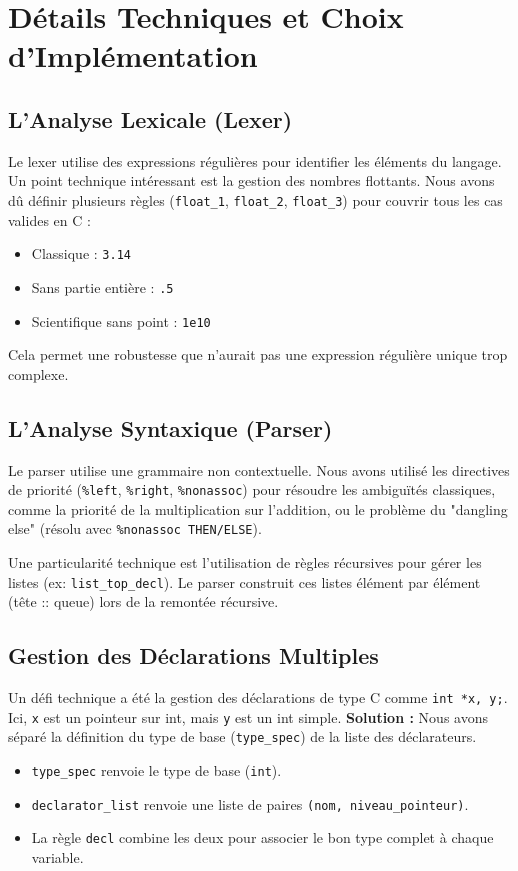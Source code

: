 \documentclass[a4paper,11pt]{article}
\begin{document}
\section{Détails Techniques et Choix d'Implémentation}

\subsection{L'Analyse Lexicale (Lexer)}
Le lexer utilise des expressions régulières pour identifier les éléments du langage.
Un point technique intéressant est la gestion des nombres flottants. Nous avons dû définir plusieurs règles (\texttt{float\_1}, \texttt{float\_2}, \texttt{float\_3}) pour couvrir tous les cas valides en C :
\begin{itemize}
    \item Classique : \texttt{3.14}
    \item Sans partie entière : \texttt{.5}
    \item Scientifique sans point : \texttt{1e10}
\end{itemize}
Cela permet une robustesse que n'aurait pas une expression régulière unique trop complexe.

\subsection{L'Analyse Syntaxique (Parser)}
Le parser utilise une grammaire non contextuelle. Nous avons utilisé les directives de priorité (\texttt{\%left}, \texttt{\%right}, \texttt{\%nonassoc}) pour résoudre les ambiguïtés classiques, comme la priorité de la multiplication sur l'addition, ou le problème du "dangling else" (résolu avec \texttt{\%nonassoc THEN/ELSE}).

Une particularité technique est l'utilisation de règles récursives pour gérer les listes (ex: \texttt{list\_top\_decl}). Le parser construit ces listes élément par élément (tête :: queue) lors de la remontée récursive.

\subsection{Gestion des Déclarations Multiples}
Un défi technique a été la gestion des déclarations de type C comme \texttt{int *x, y;}.
Ici, \texttt{x} est un pointeur sur int, mais \texttt{y} est un int simple.
\textbf{Solution :} Nous avons séparé la définition du type de base (\texttt{type\_spec}) de la liste des déclarateurs.
\begin{itemize}
    \item \texttt{type\_spec} renvoie le type de base (\texttt{int}).
    \item \texttt{declarator\_list} renvoie une liste de paires \texttt{(nom, niveau\_pointeur)}.
    \item La règle \texttt{decl} combine les deux pour associer le bon type complet à chaque variable.
\end{itemize}
\end{document}
